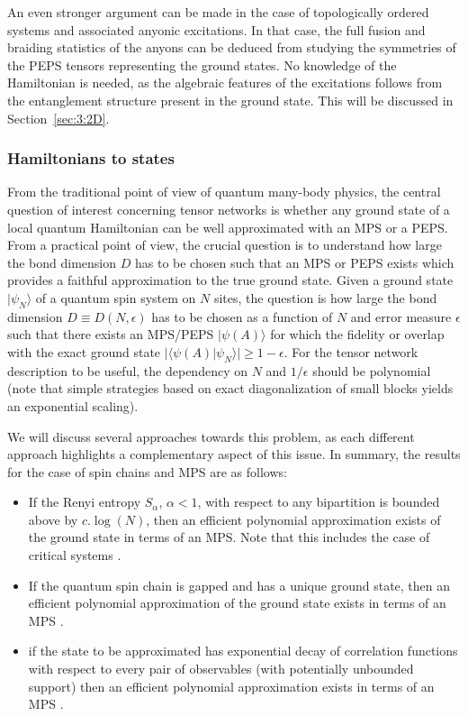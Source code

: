 \documentclass[rmp,aps,reprint,superscriptaddress,nobalancelastpage]{revtex4-1}
\begin{document}
An even stronger argument can be made in the case of topologically ordered systems and associated anyonic excitations. In that case, the full fusion and braiding statistics of the anyons can be deduced from studying the symmetries of the PEPS tensors representing the ground states. No knowledge of the Hamiltonian is needed, as the algebraic features of the excitations follows from the entanglement structure present in the ground state. This will be discussed in Section~\ref{sec:3:2D}.


\subsubsection{Hamiltonians to states}\label{sec:H-to-states}

From the traditional point of view of quantum many-body physics, the central question of interest concerning tensor networks is whether any ground state of a local quantum Hamiltonian can be well approximated with an MPS or a  PEPS.  From a practical point of view, the crucial question is to understand how large the bond dimension $D$ has to be chosen such that an MPS  or PEPS exists which provides a faithful approximation to the true ground state. Given a ground state $|\psi_N\rangle$ of a quantum spin system on $N$ sites, the question is how large the bond dimension $D\equiv D(N,\epsilon)$ has to be chosen as a function of  $N$  and error measure $\epsilon$ such that there exists an MPS/PEPS $|\psi(A)\rangle$ for which the fidelity or overlap with the exact ground state $|\langle \psi(A)|\psi_N\rangle|\geq 1-\epsilon$. For the tensor network description to be useful, the dependency on $N$ and $1/\epsilon$ should  be polynomial (note that simple strategies based on exact diagonalization of small blocks yields an exponential scaling).


We will discuss several approaches towards this problem, as each different approach highlights a complementary aspect of this issue.  In summary, the results for the case of spin chains and MPS are as follows:

\begin{itemize}
    \item If the Renyi entropy $S_\alpha$, $\alpha<1$, with respect to any bipartition is bounded above by $c.\log(N)$, then an efficient polynomial approximation exists of the ground state in terms of an MPS. Note that this includes the case of critical systems \cite{verstraete:faithfully,schuch:mps-entropies}.
    \item If the quantum spin chain is gapped and has a unique ground state, then an efficient polynomial approximation of the ground state exists in terms of an MPS \cite{hastings:arealaw,arad:1d-arealaw}.
    \item if the state to be approximated has exponential decay of correlation functions with respect to every pair of observables (with potentially unbounded support) then an efficient polynomial approximation exists in terms of an MPS \cite{brandao2013area}.
\end{itemize}
\end{document}
